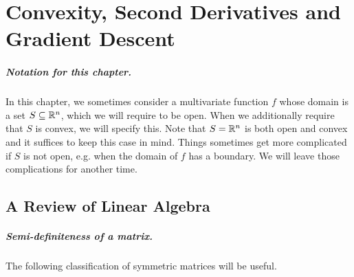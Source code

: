 \chapter{Convexity, Second Derivatives and
  Gradient Descent}
\label{sec:gd}


%
\sloppy

%
%



\paragraph{Notation for this chapter.}
  In this chapter, we sometimes consider a multivariate function $f$
  whose domain is a set $S \subseteq \mathbb{R}^n$, which we will require to
  be open.
  When we additionally require that $S$ is convex, we will specify this.
  Note that $S = \mathbb{R}^n$ is both open and convex and it suffices to keep
  this case in mind.
  Things sometimes get more complicated if $S$ is not open, e.g. when the
  domain of $f$ has a boundary.
  We will leave those complications for another time.

\section{A Review of Linear Algebra}
\paragraph{Semi-definiteness of a matrix.}  The following classification of symmetric matrices will be useful.

